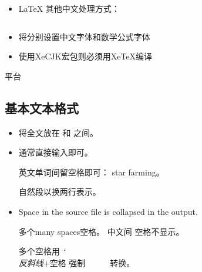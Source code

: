 \documentclass{beamer}
\begin{document}
\begin{frame}[fragile]{\insertsubsection}
\begin{itemize}
\item \LaTeX{} 其他中文处理方式：
\inputminted[frame=single]{latex}{basics-zh-cn1.tex}
\item 将分别设置中文字体和数学公式字体
\item 使用XeCJK宏包则必须用XeTeX编译
\end{itemize}
\end{frame}

\begin{frame}[fragile]{\insertsubsection{} \wllogo \small{平台}}
\end{frame}

\subsection{基本文本格式}
\begin{frame}[fragile]{\insertsubsection{}}
\small
\begin{itemize}
\item 将全文放在  和 之间。
\item 通常直接输入即可。
\begin{exampletwouptiny}
英文单词间留空格即可：
star farming。

自然段以换两行表示。
\end{exampletwouptiny}
\item Space in the source file is collapsed in the output.
\begin{exampletwouptiny}
多个many      spaces空格。
中文间         空格不显示。

多个空格用
\emph{\char`\\ 反斜线}$+$空格
强制\ \ \ \ \ \ 转换。
\end{exampletwouptiny}
\end{itemize}
\end{frame}
\end{document}
